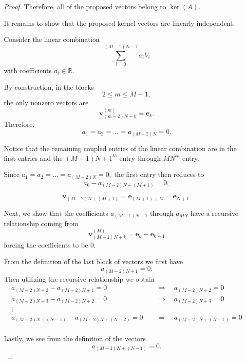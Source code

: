 \documentclass[10pt,a4paper]{amsart}
\begin{document}
\begin{proof}
Therefore, all of the proposed vectors belong to $\ker(A)$.

It remains to show that the proposed kernel vectors are linearly independent.

Consider the linear combination
\[\sum_{i=0}^{(M-1)N-1}a_iV_i\]
with coefficients $a_i\in\mathbb{R}.$

\noindent By construction, in the blocks
\[2\leq m\leq M-1,\]
the only nonzero vectors are
\[
\mathbf{v}_{(m-2)N+k}^{(m)}
=
\mathbf{e}_k.
\]
Therefore,
\[
a_1=a_2=\dots=a_{(M-2)N}=0.
\]

Notice that the remaining coupled entries of the linear combination are in the first entries and the $(M-1)N+1^{th}$ entry through $MN^{th}$ entry.

Since $a_1=a_2=\dots=a_{(M-2)N}=0,$ the first entry then reduces to
\[
a_0-a_{(M-2)N+(M+1)}=0,
\]

\[
\mathbf{v}_{(M-2)N+(M+1)}
=
\mathbf{e}_{(M+1)+M}
=
\mathbf{e}_{N+1}.
\]

Next, we show that the coefficients $a_{(M-1)N+1}$ through $a_{MN}$ have a recursive relationship coming from
\[
\mathbf{v}_{(M-2)N+k}^{(M)}
=
\mathbf{e}_k-\mathbf{e}_{k+1}
\]
forcing the coefficients to be 0.

From the definition of the last block of vectors we first have
\[ a_{(M-2)N+1}=0.\]
Then utilizing the recursive relationship we obtain
\begin{align*}
    a_{(M-2)N+2}-a_{(M-2)N+1}=0 &\quad\Rightarrow \quad a_{(M-2)N+2}=0\\
    a_{(M-2)N+3}-a_{(M-2)N+2}=0\ &\quad\Rightarrow \quad a_{(M-2)N+3}=0\\
    \vdots\\
    a_{(M-2)N+(N-1)}-a_{(M-2)N+(N-2)}=0\ &\quad\Rightarrow \quad a_{(M-2)N+(N-1)}=0\\
\end{align*}

Lastly, we see from the definition of the vectors \[a_{(M-2)N+(N-1)}=0.\]



\end{proof}
\end{document}
